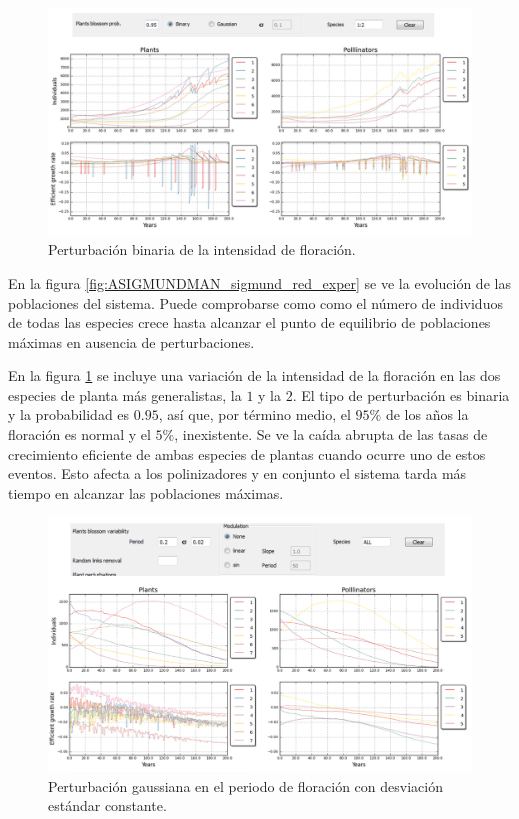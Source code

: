 \begin{figure}[h!]
\centering
\includegraphics[scale=1]{ManFigs/sigmund_oscilacion_intensidad.png}
\caption{Perturbación binaria de la intensidad de floración.}
\label{fig:ASIGMUNDMAN_sigmund_oscilacion_intensidad}
\end{figure}

En la figura \ref{fig:ASIGMUNDMAN_sigmund_red_exper} se ve la evolución de las poblaciones del sistema. Puede comprobarse como como el número de individuos de todas las especies crece hasta alcanzar el punto de equilibrio de poblaciones máximas en ausencia de perturbaciones. 

En la figura \ref{fig:ASIGMUNDMAN_sigmund_oscilacion_intensidad} se incluye una variación de la intensidad de la floración en las dos especies de planta más generalistas, la $1$ y la $2$. El tipo de perturbación es binaria y la probabilidad es $0.95$, así que, por término medio, el $95\%$ de los años la floración es normal y el $5\%$, inexistente. Se ve la caída abrupta de las tasas
de crecimiento eficiente de ambas especies de plantas cuando ocurre uno de estos eventos. Esto afecta a los polinizadores y en conjunto el sistema tarda más tiempo en alcanzar las poblaciones máximas.

\begin{figure}[h!]
\centering
\includegraphics[scale=1]{ManFigs/sigmund_oscilacion_tiempo_none.png}
\caption{Perturbación gaussiana en el periodo de floración con desviación estándar constante.}
\label{fig:ASIGMUNDMAN_sigmund_oscilacion_tiempo_none}
\end{figure}

